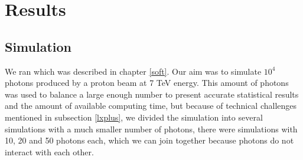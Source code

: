
\chapter{Results} %

\label{Methodology} %



\section{Simulation}
We ran \srthree which was described in chapter \ref{soft}. Our aim was to simulate $10^{4}$ photons produced by a proton beam at 7 TeV energy. This amount of photons was used to balance a large enough number to present accurate statistical results and the amount of available computing time, but because of technical challenges mentioned in subsection \ref{lxplus}, we divided the simulation into several simulations with a much smaller number of photons, there were simulations with 10, 20 and 50 photons each, which we can join together because photons do not interact with each other.



